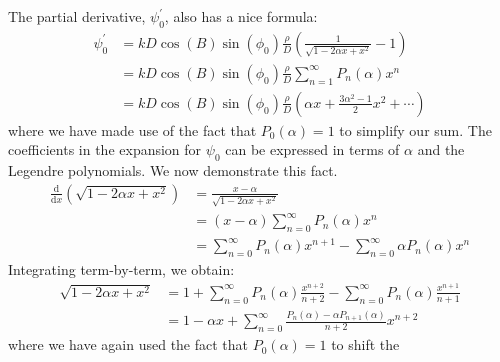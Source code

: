 \documentclass{article}
\begin{document}
        The partial derivative, $\psi^{\prime}_{0}$, also has a nice formula:
        \begin{subequations}
            \begin{align}
                \psi^{\prime}_{0}
                &=kD\cos(B)\sin(\phi_{0})\frac{\rho}{D}\left(
                    \frac{1}{\sqrt{1-2\alpha{x}+x^{2}}}-1
                \right)\\
                &=kD\cos(B)\sin(\phi_{0})\frac{\rho}{D}
                    \sum_{n=1}^{\infty}P_{n}(\alpha)x^{n}\\
                &=kD\cos(B)\sin(\phi_{0})\frac{\rho}{D}\left(
                    \alpha{x}
                    +\frac{3\alpha^{2}-1}{2}x^{2}
                    +\cdots
                \right)
            \end{align}
        \end{subequations}
        where we have made use of the fact that $P_{0}(\alpha)=1$ to simplify
        our sum. The coefficients in the expansion for $\psi_{0}$ can be
        expressed in terms of $\alpha$ and the Legendre polynomials.
        We now demonstrate this fact.
        \begin{subequations}
            \begin{align}
                \frac{\textrm{d}}{\textrm{d}x}\left(
                    \sqrt{1-2\alpha{x}+x^{2}}
                \right)
                &=\frac{x-\alpha}{\sqrt{1-2\alpha{x}+x^{2}}}\\
                &=(x-\alpha)\sum_{n=0}^{\infty}P_{n}(\alpha)x^{n}\\
                &=\sum_{n=0}^{\infty}P_{n}(\alpha)x^{n+1}
                    -\sum_{n=0}^{\infty}\alpha{P}_{n}(\alpha)x^{n}
            \end{align}
        \end{subequations}
        Integrating term-by-term, we obtain:
        \begin{subequations}
            \begin{align}
                \sqrt{1-2\alpha{x}+x^{2}}
                &=1+\sum_{n=0}^{\infty}P_{n}(\alpha)\frac{x^{n+2}}{n+2}
                    -\sum_{n=0}^{\infty}P_{n}(\alpha)\frac{x^{n+1}}{n+1}\\
                &=1-\alpha{x}+\sum_{n=0}^{\infty}
                    \frac{P_{n}(\alpha)-\alpha{P}_{n+1}(\alpha)}{n+2}x^{n+2}
            \end{align}
        \end{subequations}
        where we have again used the fact that $P_{0}(\alpha)=1$ to shift the
\end{document}
